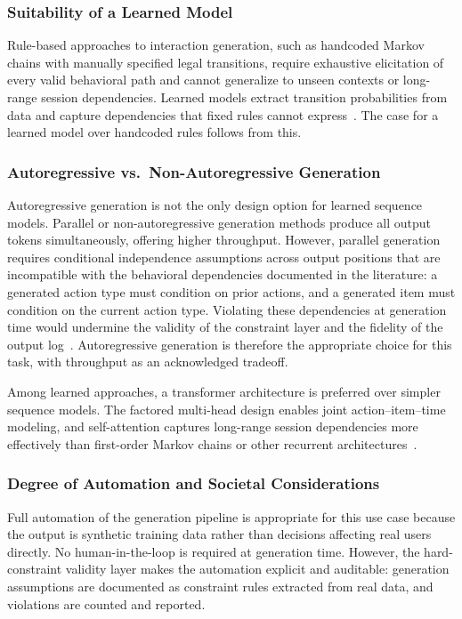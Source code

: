 \documentclass[sigconf,nonacm]{acmart}
\begin{document}
\subsubsection{Suitability of a Learned Model}
Rule-based approaches to interaction generation, such as handcoded Markov
chains with manually specified legal transitions, require exhaustive
elicitation of every valid behavioral path and cannot generalize to unseen
contexts or long-range session dependencies. Learned models extract
transition probabilities from data and capture dependencies that fixed
rules cannot express~\cite{chaney2021challenges,mcinerney2021accordion}. The
case for a learned model over handcoded rules follows from this.

\subsubsection{Autoregressive vs.\ Non-Autoregressive Generation}
Autoregressive generation is not the only design option for learned sequence
models. Parallel or non-autoregressive generation methods produce all output
tokens simultaneously, offering higher throughput. However, parallel
generation requires conditional independence assumptions across output
positions that are incompatible with the behavioral dependencies documented
in the literature: a generated action type must condition on prior actions,
and a generated item must condition on the current action type. Violating
these dependencies at generation time would undermine the validity of the
constraint layer and the fidelity of the output
log~\cite{chaney2021challenges}. Autoregressive generation is therefore the
appropriate choice for this task, with throughput as an acknowledged
tradeoff.

Among learned approaches, a transformer architecture is preferred over
simpler sequence models. The factored multi-head design enables joint
action--item--time modeling, and self-attention captures long-range session
dependencies more effectively than first-order Markov chains or other
recurrent
architectures~\cite{kang2018sasrec,sun2019bert4rec,hidasi2015gru4rec}.

\subsubsection{Degree of Automation and Societal Considerations}
Full automation of the generation pipeline is appropriate for this use case
because the output is synthetic training data rather than decisions
affecting real users directly. No human-in-the-loop is required at
generation time. However, the hard-constraint validity layer makes the
automation explicit and auditable: generation assumptions are documented as
constraint rules extracted from real data, and violations are counted and
reported.
\end{document}
